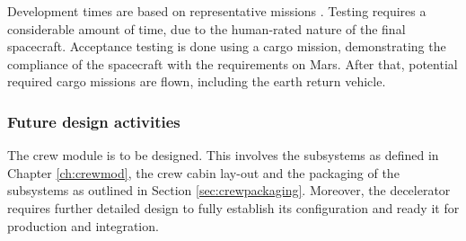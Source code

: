 Development times are based on representative missions \cite{Wertz2011}. Testing requires a considerable amount of time, due to the human-rated nature of the final spacecraft. Acceptance testing is done using a cargo mission, demonstrating the compliance of the spacecraft with the requirements on Mars. After that, potential required cargo missions are flown, including the earth return vehicle.

\subsubsection{Future design activities}
The crew module is to be designed. This involves the subsystems as defined in Chapter \ref{ch:crewmod}, the crew cabin lay-out and the packaging of the subsystems as outlined in Section \ref{sec:crewpackaging}. Moreover, the decelerator requires further detailed design to fully establish its configuration and ready it for production and integration. 

